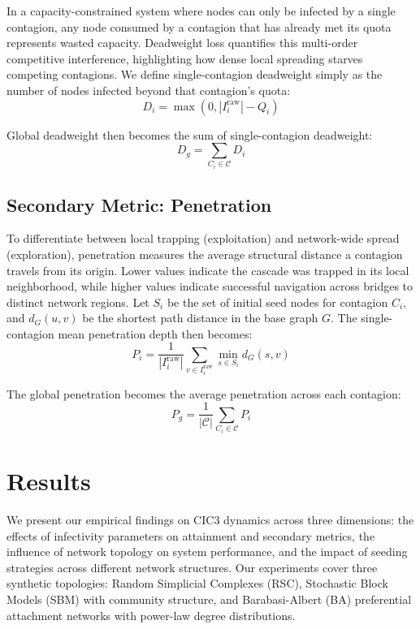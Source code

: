 \documentclass[sigconf]{acmart}
\begin{document}
In a capacity-constrained system where nodes can only be infected by a single contagion, any node consumed by a contagion that has already met its quota represents wasted capacity. Deadweight loss quantifies this multi-order competitive interference, highlighting how dense local spreading starves competing contagions. We define single-contagion deadweight simply as the number of nodes infected beyond that contagion's quota:
\begin{equation}
    D_i = \max(0, |I_i^{\text{raw}}| - Q_i)
\label{eq:deadweight}
\end{equation}

Global deadweight then becomes the sum of single-contagion deadweight:
\begin{equation}
    D_g = \sum_{C_i \in \mathcal{C}} D_i
\label{eq:global_deadweight}
\end{equation}

\subsection{Secondary Metric: Penetration}
\label{subsec:penetration}

To differentiate between local trapping (exploitation) and network-wide spread (exploration), penetration measures the average structural distance a contagion travels from its origin. Lower values indicate the cascade was trapped in its local neighborhood, while higher values indicate successful navigation across bridges to distinct network regions. Let $S_i$ be the set of initial seed nodes for contagion $C_i$, and $d_G(u,v)$ be the shortest path distance in the base graph $G$. The single-contagion mean penetration depth then becomes:
\begin{equation}
    P_i = \frac{1}{|I_i^{\text{raw}}|} \sum_{v \in I_i^{\text{raw}}} \min_{s \in S_i} d_G(s, v)
\label{eq:penetration}
\end{equation}

The global penetration becomes the average penetration across each contagion:
\begin{equation}
    P_g = \frac{1}{|\mathcal{C}|} \sum_{C_i \in \mathcal{C}} P_i
\label{eq:global_penetration}
\end{equation}

\section{Results}
\label{sec:results}

We present our empirical findings on CIC3 dynamics across three dimensions: the effects of infectivity parameters on attainment and secondary metrics, the influence of network topology on system performance, and the impact of seeding strategies across different network structures. Our experiments cover three synthetic topologies: Random Simplicial Complexes (RSC), Stochastic Block Models (SBM) with community structure, and Barabasi-Albert (BA) preferential attachment networks with power-law degree distributions.
\end{document}
